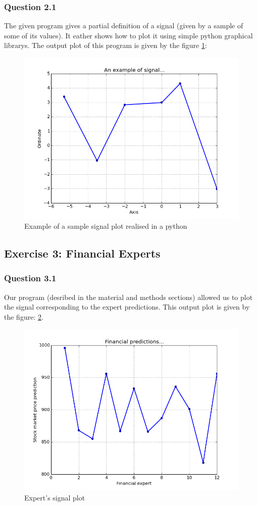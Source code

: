 \documentclass[a4paper,10pt]{article}
\begin{document}
	\subsubsection{Question 2.1}
	    The given program gives a partial definition of a signal (given by a sample of some of its values).  It eather shows how to plot it using simple python graphical librarys.
	    The output plot of this program is given by the figure \ref{exampleSignalFigure}:
	    \begin{figure}[ht!]
	      \center
	      \includegraphics[width=0.8\linewidth]{exampleSignal.png}
	      \caption{Example of a sample signal plot realised in a python}
	      \label{exampleSignalFigure}
	    \end{figure}

    \subsection{Exercise 3: Financial Experts}
	\subsubsection{Question 3.1}
	    Our program (desribed in the material and methods sections) allowed us to plot the signal corresponding to the expert predictions.  This output plot is given by the figure: \ref{expertsSignalFigure}.
	    \begin{figure}[ht!]
	      \center
	      \includegraphics[width=0.8\linewidth]{expertsSignal.png}
	      \caption{Expert's signal plot}
	      \label{expertsSignalFigure}
	    \end{figure}
\end{document}
